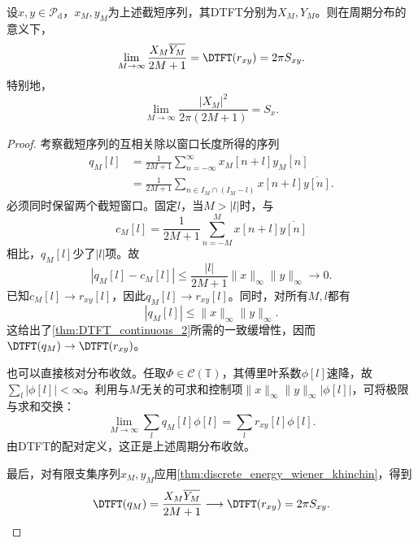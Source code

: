 \begin{theorem}\label{thm:deiscrete_winner_khinchin}
    设$x,y\in\mathcal{P}_{\mathrm d}$，$x_M,y_M$为上述截短序列，其DTFT分别为$X_M,Y_M$。则在周期分布的意义下，
    \begin{equation}
        \lim_{M\to\infty}\frac{X_M\overline{Y_M}}{2M+1}=\DTFT(r_{xy})=2\pi S_{xy}.
    \end{equation}
    特别地，
    \begin{equation}
        \lim_{M\to\infty}\frac{|X_M|^2}{2\pi(2M+1)}=S_x.
    \end{equation}
\end{theorem}
\begin{proof}
    考察截短序列的互相关除以窗口长度所得的序列
    \begin{align}
        q_M[l]
        &=\frac{1}{2M+1}\sum_{n=-\infty}^{\infty}x_M[n+l]\overline{y_M[n]} \nonumber \\
        &=\frac{1}{2M+1}\sum_{n\in I_M\cap(I_M-l)}x[n+l]\overline{y[n]}.
    \end{align}
    必须同时保留两个截短窗口。固定$l$，当$M>|l|$时，与
    \begin{equation}
        c_M[l]=\frac{1}{2M+1}\sum_{n=-M}^{M}x[n+l]\overline{y[n]}
    \end{equation}
    相比，$q_M[l]$少了$|l|$项。故
    \begin{equation}
        |q_M[l]-c_M[l]|\leq\frac{|l|}{2M+1}\|x\|_\infty\|y\|_\infty\longrightarrow 0.
    \end{equation}
    已知$c_M[l]\to r_{xy}[l]$，因此$q_M[l]\to r_{xy}[l]$。同时，对所有$M,l$都有
    \begin{equation}
        |q_M[l]|\leq\|x\|_\infty\|y\|_\infty.
    \end{equation}
    这给出了\cref{thm:DTFT_continuous_2}所需的一致缓增性，因而$\DTFT(q_M)\to\DTFT(r_{xy})$。

    也可以直接核对分布收敛。任取$\Phi\in\mathcal{C}(\mathbb{T})$，其傅里叶系数$\phi[l]$速降，故$\sum_l|\phi[l]|<\infty$。利用与$M$无关的可求和控制项$\|x\|_\infty\|y\|_\infty|\phi[l]|$，可将极限与求和交换：
    \begin{equation}
        \lim_{M\to\infty}\sum_l q_M[l]\phi[l]=\sum_l r_{xy}[l]\phi[l].
    \end{equation}
    由DTFT的配对定义，这正是上述周期分布收敛。

    最后，对有限支集序列$x_M,y_M$应用\cref{thm:discrete_energy_wiener_khinchin}，得到
    \begin{equation}
        \DTFT(q_M)=\frac{X_M\overline{Y_M}}{2M+1}\longrightarrow\DTFT(r_{xy})=2\pi S_{xy}.
    \end{equation}
\end{proof}

